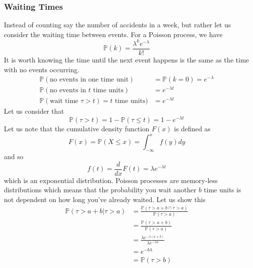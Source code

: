 \documentclass{article}
\newcommand{\od}[2]{\frac{d #1}{d #2}}
\newcommand{\p}{\mathbb{P}}
\begin{document}
\subsubsection{Waiting Times}
Instead of counting say the number of accidents in a week, but rather let us consider the waiting time between events. For a Poisson process, we have 
\begin{equation*}
    \p(k) = \frac{\lambda^ke^{-\lambda}}{k!}
\end{equation*}
It is worth knowing the time until the next event happens is the same as the time with no events occurring. 
\begin{equation*}
    \begin{split}
        \p(\text{no events in one time unit}) &=\p(k=0) = e^{-\lambda} \\
        \p(\text{no events in }t\text{ time units})&= e^{-\lambda t} \\
        \p(\text{wait time } \tau > t)=t\text{ time units})&= e^{-\lambda t}
    \end{split}
\end{equation*}
Let us consider that 
\begin{equation*}
    \p(\tau > t) =1-\p(\tau \leq t) = 1-e^{-\lambda t}
\end{equation*}
Let us note that the cumulative density function $F(x)$ is defined as
\begin{equation*}
    F(x) =\p(X\leq x)= \int^x_{-\infty}f(y) dy
\end{equation*}
and so 
\begin{equation*}
    f(t) = \od{}{x}F(t) = \lambda e^{-\lambda t}
\end{equation*}
which is an exponential distribution. Poisson processes are memory-less distributions which means that the probability you wait another $b$ time units is not dependent on how long you've already waited. Let us show this 
\begin{equation*}
    \begin{split}
        \p (\tau >a+b | \tau > a) &= \frac{\p (\tau > a+b \cap \tau >a)}{\p(\tau >a)} \\
        &= \frac{\p(\tau > a+b)}{\p(\tau>a)}\\
        &=\frac{\lambda e^{-\lambda (a+b)}}{\lambda e^{-\lambda a}} \\
        &= e^{-b\lambda}\\
        &= \p (\tau > b)
    \end{split}
\end{equation*}
\end{document}
